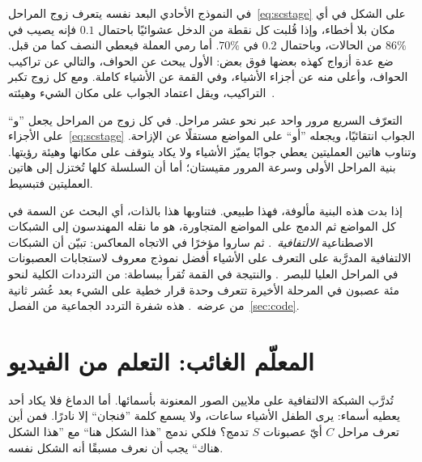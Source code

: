 في النموذج الأحادي البعد نفسه يتعرف زوج المراحل~\eqref{eq:scstage} على الشكل في أي مكان بلا أخطاء، وإذا قُلبت كل نقطة من الدخل عشوائيًا باحتمال $0.1$ فإنه يصيب في $86\%$ من الحالات، وباحتمال $0.2$ في $70\%$. أما رمي العملة فيعطي النصف كما من قبل. ضع عدة أزواج كهذه بعضها فوق بعض: الأول يبحث عن الحواف، والتالي عن تراكيب الحواف، وأعلى منه عن أجزاء الأشياء، وفي القمة عن الأشياء كاملة. ومع كل زوج تكبر التراكيب، ويقل اعتماد الجواب على مكان الشيء وهيئته~\cite{Riesenhuber1999}.

\begin{keyblock}
\begin{proposition}
\label{prop:conveyor}
التعرّف السريع مرور واحد عبر نحو عشر مراحل. في كل زوج من المراحل يجعل ”و“ على الأجزاء~\eqref{eq:scstage} الجواب انتقائيًا، ويجعله ”أو“ على المواضع مستقلًا عن الإزاحة. وتناوب هاتين العمليتين يعطي جوابًا يميّز الأشياء ولا يكاد يتوقف على مكانها وهيئة رؤيتها. بنية المراحل الأولى وسرعة المرور مقيستان؛ أما أن السلسلة كلها تُختزل إلى هاتين العمليتين فتبسيط.
\end{proposition}
\end{keyblock}

إذا بدت هذه البنية مألوفة، فهذا طبيعي. فتناوبها هذا بالذات، أي البحث عن السمة في كل المواضع ثم الدمج على المواضع المتجاورة، هو ما نقله المهندسون إلى الشبكات الاصطناعية \emph{الالتفافية}~\cite{Fukushima1980}. ثم ساروا مؤخرًا في الاتجاه المعاكس: تبيّن أن الشبكات الالتفافية المدرَّبة على التعرف على الأشياء أفضل نموذج معروف لاستجابات العصبونات في المراحل العليا للبصر~\cite{Yamins2014}. والنتيجة في القمة تُقرأ ببساطة: من الترددات الكلية لنحو مئة عصبون في المرحلة الأخيرة تتعرف وحدة قرار خطية على الشيء بعد عُشر ثانية من عرضه~\cite{Hung2005}. هذه شفرة التردد الجماعية من الفصل~\ref{sec:code}.

\section{المعلّم الغائب: التعلم من الفيديو}

تُدرَّب الشبكة الالتفافية على ملايين الصور المعنونة بأسمائها. أما الدماغ فلا يكاد أحد يعطيه أسماء: يرى الطفل الأشياء ساعات، ولا يسمع كلمة ”فنجان“ إلا نادرًا. فمن أين تعرف مراحل $C$ أيّ عصبونات $S$ تدمج؟ فلكي ندمج ”هذا الشكل هنا“ مع ”هذا الشكل هناك“ يجب أن نعرف مسبقًا أنه الشكل نفسه.

